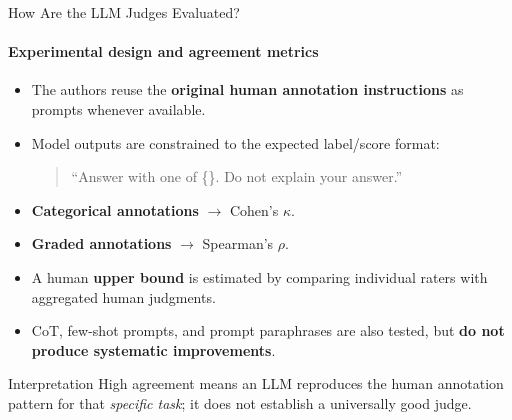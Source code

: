 \documentclass[10pt]{beamer}
\begin{document}
	\begin{frame}{How Are the LLM Judges Evaluated?}
		\framesubtitle{Experimental design and agreement metrics}
		\begin{itemize}
			\item The authors reuse the \textbf{original human annotation instructions} as prompts whenever available.
			\item Model outputs are constrained to the expected label/score format:
			\begin{quote}
				\small ``Answer with one of \{\}. Do not explain your answer.''
			\end{quote}
			\item \textbf{Categorical annotations} $\rightarrow$ Cohen's $\kappa$.
			\item \textbf{Graded annotations} $\rightarrow$ Spearman's $\rho$.
			\item A human \textbf{upper bound} is estimated by comparing individual raters with aggregated human judgments.
			\item CoT, few-shot prompts, and prompt paraphrases are also tested, but \textbf{do not produce systematic improvements}.
		\end{itemize}
		
		\vspace{0.1cm}
		\begin{block}{Interpretation}
			High agreement means an LLM reproduces the human annotation pattern for that \emph{specific task}; it does not establish a universally good judge.
		\end{block}
	\end{frame}
	
\end{document}
